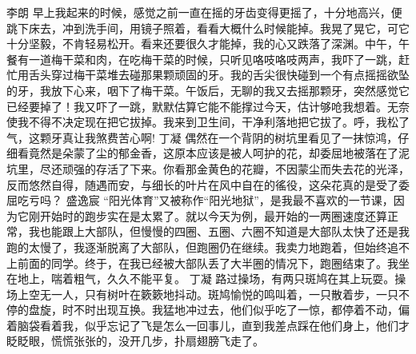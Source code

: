 {}\markdownRendererInterblockSeparator
{}李朗\markdownRendererInterblockSeparator
{}早上我起来的时候，感觉之前一直在摇的牙齿变得更摇了，十分地高兴，便跳下床去，冲到洗手间，用镜子照着，看看大概什么时候能掉。我晃了晃它，可它十分坚毅，不肯轻易松开。看来还要很久才能掉，我的心又跌落了深渊。中午，午餐有一道梅干菜和肉，在吃梅干菜的时候，只听见咯吱咯吱两声，我吓了一跳，赶忙用舌头穿过梅干菜堆去碰那果颗顽固的牙。我的舌尖很快碰到一个有点摇摇欲坠的牙，我放下心来，咽下了梅干菜。午饭后，无聊的我又去摇那颗牙，突然感觉它已经要掉了！我又吓了一跳，默默估算它能不能撑过今天，估计够呛我想着。无奈使我不得不决定现在把它拔掉。我来到卫生间，干净利落地把它拔了。呼，我松了气，这颗牙真让我煞费苦心啊!\markdownRendererInterblockSeparator
{}\markdownRendererInterblockSeparator
{}丁凝\markdownRendererInterblockSeparator
{}偶然在一个背阴的树坑里看见了一抹惊鸿，仔细看竟然是朵蒙了尘的郁金香，这原本应该是被人呵护的花，却委屈地被落在了泥坑里，尽还顽强的存活了下来。你看那金黄色的花瓣，不因蒙尘而失去花的光泽，反而悠然自得，随遇而安，与细长的叶片在风中自在的徭役，这朵花真的是受了委屈吃亏吗？\markdownRendererInterblockSeparator
{}\markdownRendererInterblockSeparator
{}盛逸宸\markdownRendererInterblockSeparator
{}“阳光体育”又被称作“阳光地狱”，是我最不喜欢的一节课，因为它刚开始时的跑步实在是太累了。就以今天为例，最开始的一两圈速度还算正常，我也能跟上大部队，但慢慢的四圈、五圈、六圈\markdownRendererEllipsis{}\markdownRendererEllipsis{}不知道是大部队太快了还是我跑的太慢了，我逐渐脱离了大部队，但跑圈仍在继续。我卖力地跑着，但始终追不上前面的同学。终于，在我已经被大部队丢了大半圈的情况下，跑圈结束了。我坐在地上，喘着粗气，久久不能平复。\markdownRendererInterblockSeparator
{}\markdownRendererInterblockSeparator
{}丁凝\markdownRendererInterblockSeparator
{}路过操场，有两只斑鸠在其上玩耍。操场上空无一人，只有树叶在簌簌地抖动。斑鸠愉悦的鸣叫着，一只散着步，一只不停的盘旋，时不时出现互换。我猛地冲过去，他们似乎吃了一惊，都停着不动，偏着脑袋看着我，似乎忘记了飞是怎么一回事儿，直到我差点踩在他们身上，他们才眨眨眼，慌慌张张的，没开几步，扑扇翅膀飞走了。\markdownRendererDocumentEnd